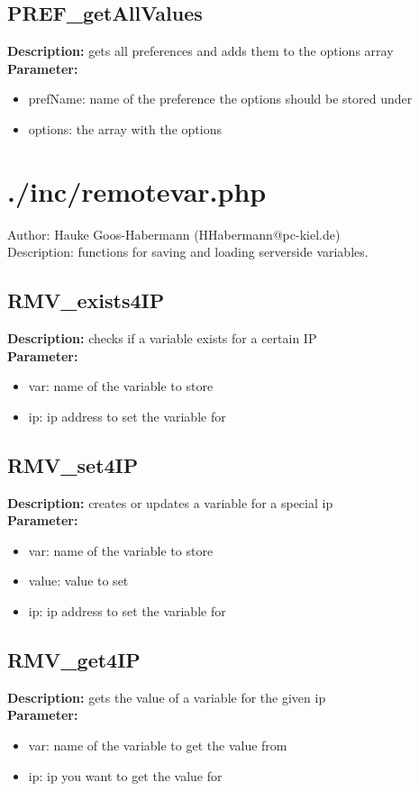 \subsection{PREF\_getAllValues}
\textbf{Description:} gets all preferences and adds them to the options array\\
\textbf{Parameter:}
\begin{itemize}
\item prefName: name of the preference the options should be stored under
\item options: the array with the options
\end{itemize}

\newpage\section{./inc/remotevar.php}
 Author: Hauke Goos-Habermann (HHabermann@pc-kiel.de)\\
 Description: functions for saving and loading serverside variables.\\

\subsection{RMV\_exists4IP}
\textbf{Description:} checks if a variable exists for a certain IP\\
\textbf{Parameter:}
\begin{itemize}
\item var: name of the variable to store
\item ip: ip address to set the variable for
\end{itemize}

\subsection{RMV\_set4IP}
\textbf{Description:} creates or updates a variable for a special ip\\
\textbf{Parameter:}
\begin{itemize}
\item var: name of the variable to store
\item value: value to set
\item ip: ip address to set the variable for
\end{itemize}

\subsection{RMV\_get4IP}
\textbf{Description:} gets the value of a variable for the given ip\\
\textbf{Parameter:}
\begin{itemize}
\item var: name of the variable to get the value from
\item ip: ip you want to get the value for
\end{itemize}

